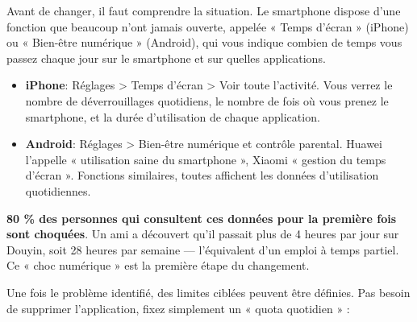 


Avant de changer, il faut comprendre la situation. Le smartphone dispose d'une fonction que beaucoup n'ont jamais ouverte, appelée « Temps d'écran » (iPhone) ou « Bien-être numérique » (Android), qui vous indique combien de temps vous passez chaque jour sur le smartphone et sur quelles applications.

\begin{itemize}
  \item \textbf{iPhone}: Réglages > Temps d'écran > Voir toute l'activité. Vous verrez le nombre de déverrouillages quotidiens, le nombre de fois où vous prenez le smartphone, et la durée d'utilisation de chaque application.
  \item \textbf{Android}: Réglages > Bien-être numérique et contrôle parental. Huawei l'appelle « utilisation saine du smartphone », Xiaomi « gestion du temps d'écran ». Fonctions similaires, toutes affichent les données d'utilisation quotidiennes.
\end{itemize}

\textbf{80 \% des personnes qui consultent ces données pour la première fois sont choquées}. Un ami a découvert qu'il passait plus de 4 heures par jour sur Douyin, soit 28 heures par semaine — l'équivalent d'un emploi à temps partiel. Ce « choc numérique » est la première étape du changement.


Une fois le problème identifié, des limites ciblées peuvent être définies. Pas besoin de supprimer l'application, fixez simplement un « quota quotidien » :

